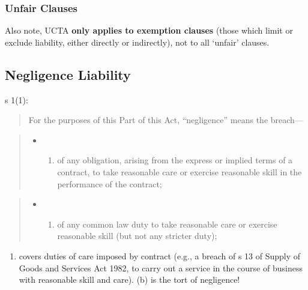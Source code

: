 \documentclass[
]{article}
\providecommand{\tightlist}{%
  \setlength{\itemsep}{0pt}\setlength{\parskip}{0pt}}
\begin{document}
\hypertarget{unfair-clauses}{%
\subsubsection{Unfair Clauses}\label{unfair-clauses}}

Also note, UCTA \textbf{only applies to exemption clauses} (those which
limit or exclude liability, either directly or indirectly), not to all
`unfair' clauses.

\hypertarget{negligence-liability}{%
\subsection{Negligence Liability}\label{negligence-liability}}

s 1(1):

\begin{quote}
For the purposes of this Part of this Act, ``negligence'' means the
breach---
\end{quote}

\begin{quote}
\begin{itemize}
\item
  \begin{enumerate}
  \def\labelenumi{(\alph{enumi})}
  \tightlist
  \item
    of any obligation, arising from the express or implied terms of a
    contract, to take reasonable care or exercise reasonable skill in
    the performance of the contract;
  \end{enumerate}
\end{itemize}
\end{quote}

\begin{quote}
\begin{itemize}
\item
  \begin{enumerate}
  \def\labelenumi{(\alph{enumi})}
  \setcounter{enumi}{1}
  \tightlist
  \item
    of any common law duty to take reasonable care or exercise
    reasonable skill (but not any stricter duty);
  \end{enumerate}
\end{itemize}
\end{quote}

\begin{enumerate}
\def\labelenumi{(\alph{enumi})}
\tightlist
\item
  covers duties of care imposed by contract (e.g., a breach of s 13 of
  Supply of Goods and Services Act 1982, to carry out a service in the
  course of business with reasonable skill and care). (b) is the tort of
  negligence!
\end{enumerate}
\end{document}
